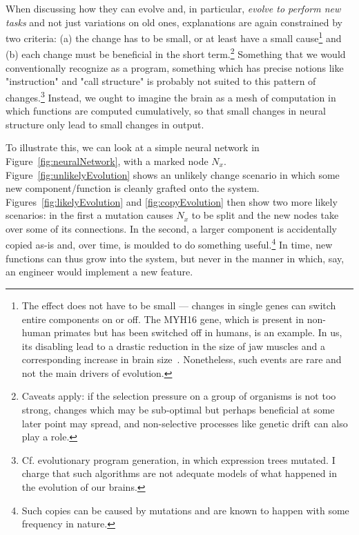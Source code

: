 When discussing how they can evolve and, in particular, {\em evolve to perform new tasks} and not just variations on old ones, explanations are again constrained by two criteria: (a) the change has to be small, or at least have a small cause\footnote{The effect does not have to be small --- changes in single genes can switch entire components on or off. The MYH16 gene, which is present in non-human primates but has been switched off in humans, is an example. In us, its disabling lead to a drastic reduction in the size of jaw muscles and a corresponding increase in brain size~\cite{carroll2005}. Nonetheless, such events are rare and not the main drivers of evolution.} and (b) each change must be beneficial in the short term.\footnote{Caveats apply: if the selection pressure on a group of organisms is not too strong, changes which may be sub-optimal but perhaps beneficial at some later point may spread, and non-selective processes like genetic drift can also play a role.} Something that we would conventionally recognize as a program, something which has precise notions like "instruction" and "call structure" is probably not suited to this pattern of changes.\footnote{Cf. evolutionary program generation, in which expression trees mutated. I charge that such algorithms are not adequate models of what happened in the evolution of our brains.} Instead, we ought to imagine the brain as a mesh of computation in which functions are computed cumulatively, so that small changes in neural structure only lead to small changes in output.

To illustrate this, we can look at a simple neural network in Figure~\ref{fig:neuralNetwork}, with a marked node $N_x$. Figure~\ref{fig:unlikelyEvolution} shows an unlikely change scenario in which some new component/function is cleanly grafted onto the system. Figures~\ref{fig:likelyEvolution} and \ref{fig:copyEvolution} then show two more likely scenarios: in the first a mutation causes $N_x$ to be split and the new nodes take over some of its connections. In the second, a larger component is accidentally copied as-is and, over time, is moulded to do something useful.\footnote{Such copies can be caused by mutations and are known to happen with some frequency in nature.} In time, new functions can thus grow into the system, but never in the manner in which, say, an engineer would implement a new feature. 

